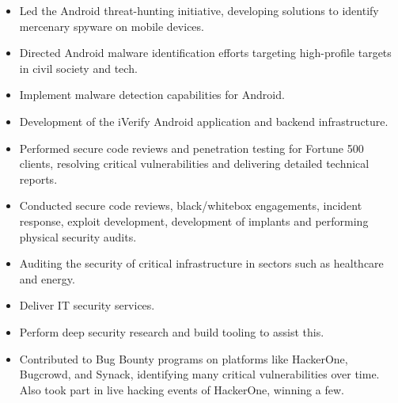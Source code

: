 \documentclass[10pt,a4paper,ragged2e,withhyper]{altacv}
\begin{document}
\begin{paracol}{2}

\begin{itemize}
\item Led the Android threat-hunting initiative, developing solutions to identify mercenary spyware on mobile devices.
\item Directed Android malware identification efforts targeting high-profile targets in civil society and tech.
\item Implement malware detection capabilities for Android.
\item Development of the iVerify Android application and backend infrastructure.
\end{itemize}

\divider
\vspace{0.5em}

\begin{itemize}
\item Performed secure code reviews and penetration testing for Fortune 500 clients, resolving critical vulnerabilities and delivering detailed technical reports.
\end{itemize}

\divider
\vspace{0.5em}

\begin{itemize}
\item Conducted secure code reviews, black/whitebox engagements, incident response, exploit development, development of implants and performing physical security audits.
\item Auditing the security of critical infrastructure in sectors such as healthcare and energy.
\end{itemize}

\divider
\vspace{0.5em}

\begin{itemize}
\item Deliver IT security services.
\item Perform deep security research and build tooling to assist this.
\item Contributed to Bug Bounty programs on platforms like HackerOne, Bugcrowd, and Synack, identifying many critical vulnerabilities over time. Also took part in live hacking events of HackerOne, winning a few.
\end{itemize}


\end{paracol}
\end{document}
